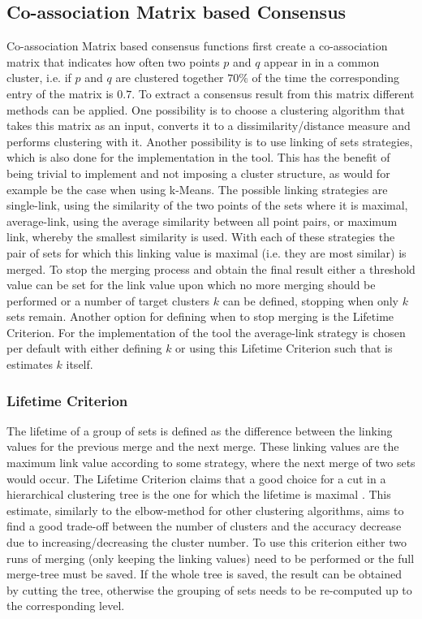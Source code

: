 \documentclass[
	a4paper,
	english,
	twoside,
	openright,               
	11pt                            
	]{report}
\begin{document}
\subsection{Co-association Matrix based Consensus}
Co-association Matrix based consensus functions \cite{Monti2003} first create a co-association matrix that indicates how often two points $p$ and $q$ appear in in a common cluster, i.e. if $p$ and $q$ are clustered together $70\%$ of the time the corresponding entry of the matrix is $0.7$. To extract a consensus result from this matrix different methods can be applied. One possibility is to choose a clustering algorithm that takes this matrix as an input, converts it to a dissimilarity/distance measure and performs clustering with it. Another possibility is to use linking of sets strategies, which is also done for the implementation in the tool. This has the benefit of being trivial to implement and not imposing a cluster structure, as would for example be the case when using k-Means. The possible linking strategies are single-link, using the similarity of the two points of the sets where it is maximal, average-link, using the average similarity between all point pairs, or maximum link, whereby the smallest similarity is used. With each of these strategies the pair of sets for which this linking value is maximal (i.e. they are most similar) is merged. To stop the merging process and obtain the final result either a threshold value can be set for the link value upon which no more merging should be performed or a number of target clusters $k$ can be defined, stopping when only $k$ sets remain. Another option for defining when to stop merging is the Lifetime Criterion. For the implementation of the tool the average-link strategy is chosen per default with either defining $k$ or using this Lifetime Criterion such that is estimates $k$ itself.

\subsubsection{Lifetime Criterion}
The lifetime of a group of sets is defined as the difference between the linking values for the previous merge and the next merge. These linking values are the maximum link value according to some strategy, where the next merge of two sets would occur. The Lifetime Criterion claims that a good choice for a cut in a hierarchical clustering tree is the one for which the lifetime is maximal \cite{YANG201735}. This estimate, similarly to the elbow-method for other clustering algorithms, aims to find a good trade-off between the number of clusters and the accuracy decrease due to increasing/decreasing the cluster number. To use this criterion either two runs of merging (only keeping the linking values) need to be performed or the full merge-tree must be saved. If the whole tree is saved, the result can be obtained by cutting the tree, otherwise the grouping of sets needs to be re-computed up to the corresponding level.
\end{document}

